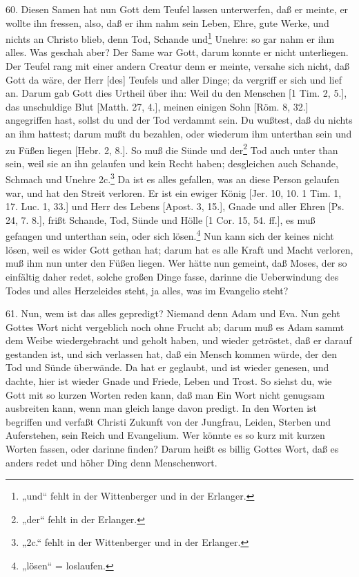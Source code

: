 60. Diesen Samen hat nun Gott dem Teufel lassen unterwerfen, daß er meinte, er wollte ihn fressen, also, daß er ihm nahm sein Leben, Ehre, gute Werke, und nichts an Christo blieb, denn Tod, Schande und\footnote{„und“ fehlt in der Wittenberger und in der Erlanger.} Unehre: so gar nahm er ihm alles. Was geschah aber? Der Same war Gott, darum konnte er nicht unterliegen. Der Teufel rang mit einer andern Creatur denn er meinte, versahe sich nicht, daß Gott da wäre, der Herr [des] Teufels und aller Dinge; da vergriff er sich und lief an. Darum gab Gott dies Urtheil über ihn: Weil du den Menschen [1 Tim. 2, 5.], das unschuldige Blut [Matth. 27, 4.], meinen einigen Sohn [Röm. 8, 32.] angegriffen hast, sollst du und der Tod verdammt sein. Du wußtest, daß du nichts an ihm hattest; darum mußt du bezahlen, oder wiederum ihm unterthan sein und zu Füßen liegen [Hebr. 2, 8.]. So muß die Sünde und der\footnote{„der“ fehlt in der Erlanger.} Tod auch unter
than sein, weil sie an ihn gelaufen und kein Recht haben; desgleichen auch Schande, Schmach und Unehre 2c.\footnote{„2c.“ fehlt in der Wittenberger und in der Erlanger.} Da ist es alles gefallen, was an diese Person gelaufen war, und hat den Streit verloren. Er ist ein ewiger König [Jer. 10, 10. 1 Tim. 1, 17. Luc. 1, 33.] und Herr des Lebens [Apost. 3, 15.], Gnade und aller Ehren [Ps. 24, 7. 8.], frißt Schande, Tod, Sünde und Hölle [1 Cor. 15, 54. ff.], es muß gefangen und unterthan sein, oder sich lösen.\footnote{„lösen“ = loslaufen.} Nun kann sich der keines nicht lösen, weil es wider Gott gethan hat; darum hat es alle Kraft und Macht verloren, muß ihm nun unter den Füßen liegen. Wer hätte nun gemeint, daß Moses, der so einfältig daher redet, solche großen Dinge fasse, darinne die Ueberwindung des Todes und alles Herzeleides steht, ja alles, was im Evangelio steht?

61. Nun, wem ist das alles gepredigt? Niemand denn Adam und Eva. Nun geht Gottes Wort nicht vergeblich noch ohne Frucht ab; darum muß es Adam sammt dem Weibe wiedergebracht und geholt haben, und wieder getröstet, daß er darauf gestanden ist, und sich verlassen hat, daß ein Mensch kommen würde, der den Tod und Sünde überwände. Da hat er geglaubt, und ist wieder genesen, und dachte, hier ist wieder Gnade und Friede, Leben und Trost. So siehst du, wie Gott mit so kurzen Worten reden kann, daß man Ein Wort nicht genugsam ausbreiten kann, wenn man gleich lange davon predigt. In den Worten ist begriffen und verfaßt Christi Zukunft von der Jungfrau, Leiden, Sterben und Auferstehen, sein Reich und Evangelium. Wer könnte es so kurz mit kurzen Worten fassen, oder darinne finden? Darum heißt es billig Gottes Wort, daß es anders redet und höher Ding denn Menschenwort.

